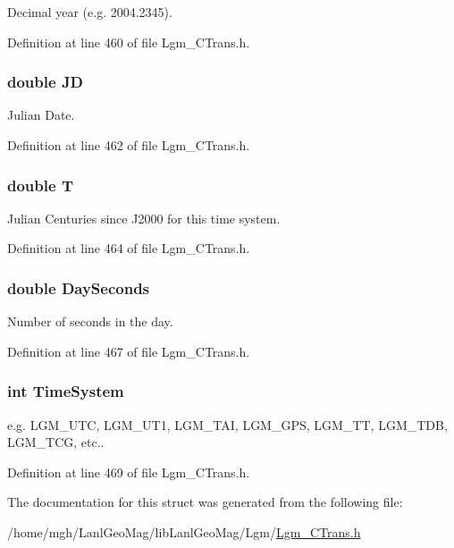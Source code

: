 Decimal year (e.g. 2004.2345). 



Definition at line 460 of file Lgm\_\-CTrans.h.\hypertarget{struct_lgm___date_time_fca64005cd84fa9e811dac5219a618ad}{
\subsubsection[{JD}]{\setlength{\rightskip}{0pt plus 5cm}double {\bf JD}}}
\label{struct_lgm___date_time_fca64005cd84fa9e811dac5219a618ad}


Julian Date. 



Definition at line 462 of file Lgm\_\-CTrans.h.\hypertarget{struct_lgm___date_time_c94a6e5794c2d7b59588b14025cfba20}{
\subsubsection[{T}]{\setlength{\rightskip}{0pt plus 5cm}double {\bf T}}}
\label{struct_lgm___date_time_c94a6e5794c2d7b59588b14025cfba20}


Julian Centuries since J2000 for this time system. 



Definition at line 464 of file Lgm\_\-CTrans.h.\hypertarget{struct_lgm___date_time_4d93ea1d3c17e97bcb29061f1b349a2d}{
\subsubsection[{DaySeconds}]{\setlength{\rightskip}{0pt plus 5cm}double {\bf DaySeconds}}}
\label{struct_lgm___date_time_4d93ea1d3c17e97bcb29061f1b349a2d}


Number of seconds in the day. 



Definition at line 467 of file Lgm\_\-CTrans.h.\hypertarget{struct_lgm___date_time_1d23811e336d585ee5dd39f311f13f92}{
\subsubsection[{TimeSystem}]{\setlength{\rightskip}{0pt plus 5cm}int {\bf TimeSystem}}}
\label{struct_lgm___date_time_1d23811e336d585ee5dd39f311f13f92}


e.g. LGM\_\-UTC, LGM\_\-UT1, LGM\_\-TAI, LGM\_\-GPS, LGM\_\-TT, LGM\_\-TDB, LGM\_\-TCG, etc.. 



Definition at line 469 of file Lgm\_\-CTrans.h.

The documentation for this struct was generated from the following file:\begin{CompactItemize}
\item 
/home/mgh/LanlGeoMag/libLanlGeoMag/Lgm/\hyperlink{_lgm___c_trans_8h}{Lgm\_\-CTrans.h}\end{CompactItemize}
